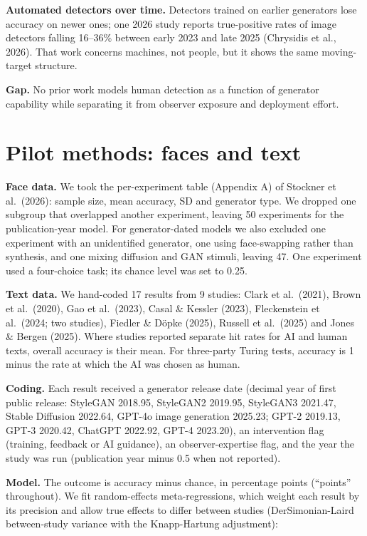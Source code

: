 \documentclass[11pt]{article}
\begin{document}
\textbf{Automated detectors over time.} Detectors trained on earlier
generators lose accuracy on newer ones; one 2026 study reports
true-positive rates of image detectors falling 16--36\% between early
2023 and late 2025 (Chrysidis et al., 2026). That work concerns
machines, not people, but it shows the same moving-target structure.

\textbf{Gap.} No prior work models human detection as a function of
generator capability while separating it from observer exposure and
deployment effort.

\hypertarget{pilot-methods-faces-and-text}{%
\section{Pilot methods: faces and
text}\label{pilot-methods-faces-and-text}}

\textbf{Face data.} We took the per-experiment table (Appendix A) of
Stockner et al.~(2026): sample size, mean accuracy, SD and generator
type. We dropped one subgroup that overlapped another experiment,
leaving 50 experiments for the publication-year model. For
generator-dated models we also excluded one experiment with an
unidentified generator, one using face-swapping rather than synthesis,
and one mixing diffusion and GAN stimuli, leaving 47. One experiment
used a four-choice task; its chance level was set to 0.25.

\textbf{Text data.} We hand-coded 17 results from 9 studies: Clark et
al.~(2021), Brown et al.~(2020), Gao et al.~(2023), Casal \& Kessler
(2023), Fleckenstein et al.~(2024; two studies), Fiedler \& Döpke
(2025), Russell et al.~(2025) and Jones \& Bergen (2025). Where studies
reported separate hit rates for AI and human texts, overall accuracy is
their mean. For three-party Turing tests, accuracy is 1 minus the rate
at which the AI was chosen as human.

\textbf{Coding.} Each result received a generator release date (decimal
year of first public release: StyleGAN 2018.95, StyleGAN2 2019.95,
StyleGAN3 2021.47, Stable Diffusion 2022.64, GPT-4o image generation
2025.23; GPT-2 2019.13, GPT-3 2020.42, ChatGPT 2022.92, GPT-4 2023.20),
an intervention flag (training, feedback or AI guidance), an
observer-expertise flag, and the year the study was run (publication
year minus 0.5 when not reported).

\textbf{Model.} The outcome is accuracy minus chance, in percentage
points (``points'' throughout). We fit random-effects meta-regressions,
which weight each result by its precision and allow true effects to
differ between studies (DerSimonian-Laird between-study variance with
the Knapp-Hartung adjustment):
\end{document}
